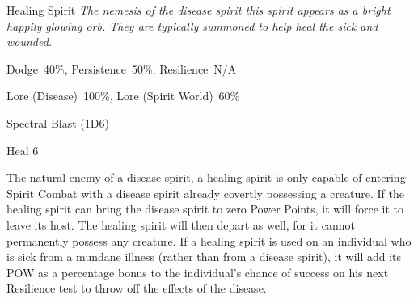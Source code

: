 \begin{monsterbox}{Healing Spirit}
	\textit{The nemesis of the disease spirit this spirit appears as a bright happily glowing orb. They are typically summoned to help heal the sick and wounded.}\\
	\rpghline
	\basics[%
	powerpoints = 14,
	movementrate = 30m,
	plunderrating = 0
	]
	\rpghline%
	\stats[ %
		STR = -,
		CON = -,
		DEX = -,
		SIZ = -,
		INT = 2D6    (7),
		POW = 4D6    (14),
		CHA = 3D6    (11)
	]
	\rpghline%
	\begin{rpg-monsteraction}[Resistances]
		Dodge~40\%, Persistence~50\%, Resilience~N/A
	\end{rpg-monsteraction}
	\begin{rpg-monsteraction}[Knowledge]
		Lore (Disease)~100\%, Lore (Spirit World)~60\%
	\end{rpg-monsteraction}
	\begin{rpg-monsteraction}
		Spectral Blast (1D6)
	\end{rpg-monsteraction}
	\begin{rpg-monsteraction}[Magic 100\%]
		Heal 6
	\end{rpg-monsteraction}
	\begin{rpg-monsteraction}
		The natural enemy of a disease spirit, a healing spirit is only capable of entering Spirit Combat with a disease spirit already covertly possessing a creature. If the healing spirit can bring the disease spirit to zero Power Points, it will force it to leave its host. The healing spirit will then depart as well, for it cannot permanently possess any creature. If a healing spirit is used on an individual who is sick from a mundane illness (rather than from a disease spirit), it will add its POW as a percentage bonus to the individual’s chance of success on his next Resilience test to throw off the effects of the disease.
	\end{rpg-monsteraction}
\end{monsterbox}



